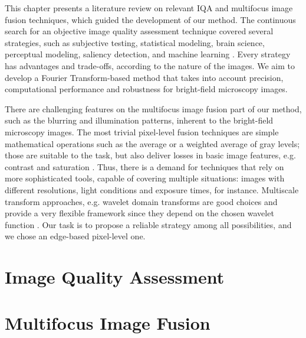 This chapter presents a literature review on relevant IQA and multifocus image fusion techniques, which guided the development of our method. The continuous search for an objective image quality assessment technique covered several strategies, such as subjective testing, statistical modeling, brain science, perceptual modeling, saliency detection, and machine learning \cite{tang2019feature}. Every strategy has advantages and trade-offs, according to the nature of the images. We aim to develop a Fourier Transform-based method that takes into account precision, computational performance and robustness for bright-field microscopy images.

There are challenging features on the multifocus image fusion part of our method, such as the blurring and illumination patterns, inherent to the bright-field microscopy images. The most trivial pixel-level fusion techniques are simple mathematical operations such as the average or a weighted average of gray levels; those are suitable to the task, but also deliver losses in basic image features, e.g. contrast and saturation \cite{zhang2009multifocus}. Thus, there is a demand for techniques that rely on more sophisticated tools, capable of covering multiple situations: images with different resolutions, light conditions and exposure times, for instance. Multiscale transform approaches, e.g. wavelet domain transforms are good choices and provide a very flexible framework since they depend on the chosen wavelet function \cite{pajares2004wavelet}. Our task is to propose a reliable strategy among all possibilities, and we chose an edge-based pixel-level one.  

\section{Image Quality Assessment}


\section{Multifocus Image Fusion}
